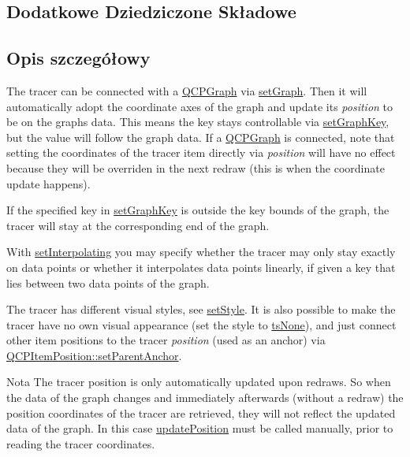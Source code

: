 \subsection*{Dodatkowe Dziedziczone Składowe}


\subsection{Opis szczegółowy}
 The tracer can be connected with a \hyperlink{class_q_c_p_graph}{Q\+C\+P\+Graph} via \hyperlink{class_q_c_p_item_tracer_af5886f4ded8dd68cb4f3388f390790c0}{set\+Graph}. Then it will automatically adopt the coordinate axes of the graph and update its {\itshape position} to be on the graph\textquotesingle{}s data. This means the key stays controllable via \hyperlink{class_q_c_p_item_tracer_a6840143b42f3b685cedf7c6d83a704c8}{set\+Graph\+Key}, but the value will follow the graph data. If a \hyperlink{class_q_c_p_graph}{Q\+C\+P\+Graph} is connected, note that setting the coordinates of the tracer item directly via {\itshape position} will have no effect because they will be overriden in the next redraw (this is when the coordinate update happens).

If the specified key in \hyperlink{class_q_c_p_item_tracer_a6840143b42f3b685cedf7c6d83a704c8}{set\+Graph\+Key} is outside the key bounds of the graph, the tracer will stay at the corresponding end of the graph.

With \hyperlink{class_q_c_p_item_tracer_a6c244a9d1175bef12b50afafd4f5fcd2}{set\+Interpolating} you may specify whether the tracer may only stay exactly on data points or whether it interpolates data points linearly, if given a key that lies between two data points of the graph.

The tracer has different visual styles, see \hyperlink{class_q_c_p_item_tracer_a41a2ac4f1acd7897b4e2a2579c03204e}{set\+Style}. It is also possible to make the tracer have no own visual appearance (set the style to \hyperlink{class_q_c_p_item_tracer_a2f05ddb13978036f902ca3ab47076500aac27462c79146225bfa8fba24d2ee8a4}{ts\+None}), and just connect other item positions to the tracer {\itshape position} (used as an anchor) via \hyperlink{class_q_c_p_item_position_ac094d67a95d2dceafa0d50b9db3a7e51}{Q\+C\+P\+Item\+Position\+::set\+Parent\+Anchor}.

\begin{DoxyNote}{Nota}
The tracer position is only automatically updated upon redraws. So when the data of the graph changes and immediately afterwards (without a redraw) the position coordinates of the tracer are retrieved, they will not reflect the updated data of the graph. In this case \hyperlink{class_q_c_p_item_tracer_a5b90296109e36384aedbc8908a670413}{update\+Position} must be called manually, prior to reading the tracer coordinates. 
\end{DoxyNote}


